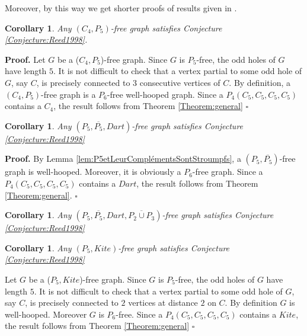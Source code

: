 \documentclass{amsart}
\newtheorem{cor}[thm]{Corollary}
\theoremstyle{definition}
\theoremstyle{remark}
\newenvironment{prf}{{\bf \noindent Proof. } }{\hfill$\square$\\}
\newcommand{\wh}{well-hooped\xspace}
\begin{document}
Moreover, by this way we get shorter proofs of results given in \cite{AraKarSub2011}.

\begin{cor} \cite{AraKarSub2011} Any $(C_{4},P_{5})$-free graph satisfies Conjecture \ref{Conjecture:Reed1998}.
\end{cor}
\begin{prf} Let $G$ be a ($C_4,P_5$)-free graph. Since $G$ is $P_5$-free, the odd holes of $G$ have length $5$. It is not difficult to check that a vertex partial to some odd hole of $G$, say $C$, 
is precisely connected to $3$ consecutive vertices of $C$.
 By definition, a $(C_{4},P_{5})$-free graph is  a 
$P_6$-free \wh graph. Since a $P_{4}(C_{5},C_{5},C_{5},C_{5})$  contains a $C_{4}$, the result follows from Theorem \ref{Theorem:general}
\end{prf}

\begin{cor}  Any $(P_{5},\overline{P_{5}},Dart)$-free graph satisfies Conjecture \ref{Conjecture:Reed1998}
\end{cor}
\begin{prf} By Lemma \ref{lem:P5etLeurComplémentsSontStroumpfs}, a  $(P_{5},\overline{P_{5}})$-free graph is \wh. 
Moreover, it is obviously a $P_6$-free graph. Since a $P_{4}(C_{5},C_{5},C_{5},C_{5})$  contains a $Dart$, the result follows from Theorem \ref{Theorem:general}.
\end{prf}

\begin{cor} \cite{AraKarSub2011} Any $(P_{5},\overline{P_{5}}, Dart, \overline{P_{2} \cup P_{3}})$-free graph satisfies Conjecture \ref{Conjecture:Reed1998}
\end{cor}



\begin{cor}  Any $(P_{5},Kite)$-free graph satisfies Conjecture \ref{Conjecture:Reed1998}
\end{cor}

\begin{prf} 
Let $G$ be a ($P_5, Kite$)-free graph. Since $G$ is $P_5$-free, the odd holes of $G$ have length $5$. It is not difficult to check that a vertex partial to some odd hole of $G$, say $C$, 
is precisely connected to $2$ vertices at distance $2$ on $C$.
By definition $G$ is  \wh. Moreover $G$ is $P_6$-free. Since a $P_{4}(C_{5},C_{5},C_{5},C_{5})$  contains a $Kite$, 
the result follows from Theorem \ref{Theorem:general}
\end{prf}
\end{document}
